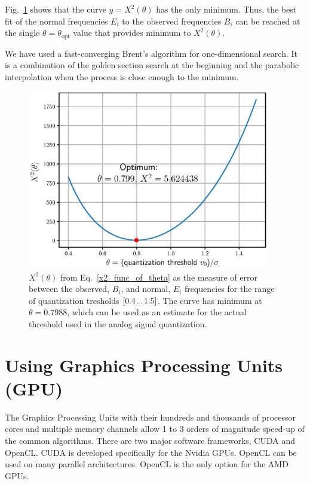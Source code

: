 \documentclass[letterpaper,twoside,12pt]{article}
\begin{document}
Fig.~\ref{optimum_theta} shows that the curve $y = X^2(\theta)$ has the only minimum. Thus, the best fit of the normal frequencies $E_i$ to the observed frequencies $B_i$ can be reached at the single $\theta=\theta_\text{opt}$ value that provides minimum to $X^2(\theta)$. 

We have used a fast-converging Brent's algorithm for one-dimensional search. It is a combination of the golden section search at the beginning and the parabolic interpolation when the process is close enough to the minimum.


\begin{figure}[ht!]
  \begin{center}
  \includegraphics[width=25pc]{fig_optimal_quantization_threshold.eps}
  \caption{\small $X^2(\theta)$ from Eq.~\eqref{x2_func_of_theta} as the measure of error between the observed, $B_i$, and normal, $E_i$ frequencies for the range of quantization tresholds $[0.4 \mathinner{\ldotp\ldotp}1.5]$. The curve has minimum at $\theta = 0.7988$, which can be used as an estimate for the actual threshold used in the analog signal quantization.}
  \label{optimum_theta}
  \end{center}
\end{figure}


\section{Using Graphics Processing Units (GPU)}

The Graphics Processing Units with their hundreds and thousands of processor cores and multiple memory channels allow 1 to 3 orders of magnitude speed-up of the common algorithms. There are two major software frameworks, CUDA and OpenCL. CUDA is developed specifically for the Nvidia GPUs. OpenCL can be used on many parallel architectures. OpenCL is the only option for the AMD GPUs.
\end{document}
